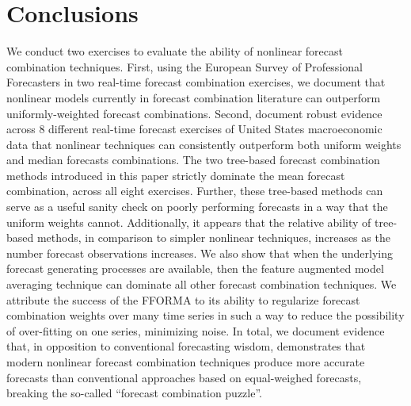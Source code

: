 \documentclass[12pt]{article}
\begin{document}
\section{Conclusions}
We conduct two exercises to evaluate the ability of nonlinear forecast combination techniques. First, using the European Survey of Professional Forecasters in two real-time forecast combination exercises, we document that nonlinear models currently in forecast combination literature can outperform uniformly-weighted forecast combinations. 
Second, document robust evidence across 8 different real-time forecast exercises of United States macroeconomic data that nonlinear techniques can consistently outperform both uniform weights and median forecasts combinations. The two tree-based forecast combination methods introduced in this paper strictly dominate the mean forecast combination, across all eight exercises. Further, these tree-based methods can serve as a useful sanity check on poorly performing forecasts in a way that the uniform weights cannot. Additionally, it appears that the relative ability of tree-based methods, in comparison to simpler nonlinear techniques, increases as the number forecast observations increases. We also show that when the underlying forecast generating processes are available, then the feature augmented model averaging technique can  dominate all other forecast combination techniques. We attribute the success of the FFORMA to its ability to regularize forecast combination weights over many time series in such a way to reduce the possibility of over-fitting on one series, minimizing noise.  
In total, we document evidence that, in opposition to conventional forecasting wisdom, demonstrates that modern nonlinear forecast combination techniques produce more accurate forecasts than conventional approaches based on equal-weighed forecasts, breaking the so-called ``forecast combination puzzle''.

\end{document}
